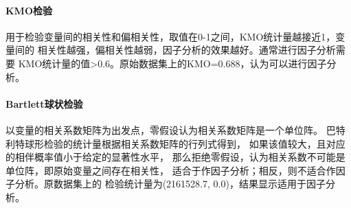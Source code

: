 \paragraph{KMO检验}
用于检验变量间的相关性和偏相关性，取值在0-1之间，KMO统计量越接近1，变量间的
相关性越强，偏相关性越弱，因子分析的效果越好。通常进行因子分析需要
KMO统计量的值>0.6。原始数据集上的KMO=0.688，认为可以进行因子分析。

\paragraph{Bartlett球状检验}
以变量的相关系数矩阵为出发点，零假设认为相关系数矩阵是一个单位阵。
巴特利特球形检验的统计量根据相关系数矩阵的行列式得到，
如果该值较大，且对应的相伴概率值小于给定的显著性水平，
那么拒绝零假设，认为相关系数不可能是单位阵，即原始变量之间存在相关性，
适合于作因子分析；相反，则不适合作因子分析。原数据集上的
检验统计量为(2161528.7, 0.0)，结果显示适用于因子分析。

